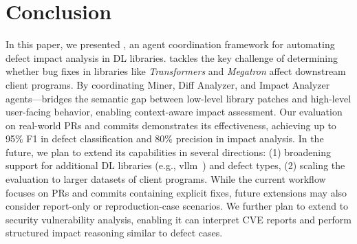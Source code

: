 \section{Conclusion}
\label{conclusion}

In this paper, we presented \appname, an agent coordination framework for automating defect impact analysis in DL libraries.
\appname tackles the key challenge of determining whether bug fixes in libraries like \textit{Transformers} and \textit{Megatron} affect downstream client programs.
By coordinating Miner, Diff Analyzer, and Impact Analyzer agents—\appname bridges the semantic gap between low-level library patches and high-level user-facing behavior, enabling context-aware impact assessment. 
Our evaluation on real-world PRs and commits demonstrates its effectiveness, achieving up to 95\% F1 in defect classification and 80\% precision in impact analysis.
In the future, we plan to extend its capabilities in several directions: (1) broadening support for additional DL libraries (e.g., vllm~\cite{vllm}) and defect types, (2) scaling the evaluation to larger datasets of client programs.
While the current workflow focuses on PRs and commits containing explicit fixes, future extensions may also consider report-only or reproduction-case scenarios.
We further plan to extend \appname to security vulnerability analysis, enabling it can interpret CVE reports and perform structured impact reasoning similar to defect cases.